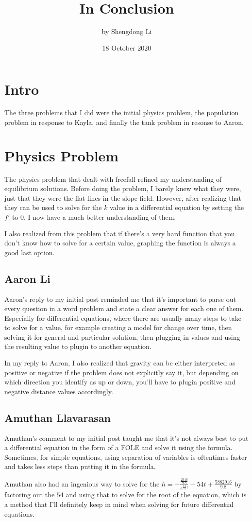 \documentclass[12pt]{article}
\begin{document}
\title{In Conclusion}
\author{by Shengdong Li}
\date{18 October 2020}
\maketitle

\section{Intro}
The three problems that I did were the initial physics problem, the population problem in response to Kayla, and finally the tank problem in resonse to Aaron.

\section{Physics Problem}
The physics problem that dealt with freefall refined my understanding of equilibrium solutions. Before doing the problem, I barely knew what they were, just that they were the flat lines in the slope field. However, after realizing that they can be used to solve for the $k$ value in a differential equation by setting the $f'$ to $0$, I now have a much better understanding of them. \par
I also realized from this problem that if there's a very hard function that you don't know how to solve for a certain value, graphing the function is always a good last option.
\subsection{Aaron Li}
Aaron's reply to my initial post reminded me that it's important to parse out every question in a word problem and state a clear answer for each one of them. Especially for differential equations, where there are usually many steps to take to solve for a value, for example creating a model for change over time, then solving it for general and particular solution, then plugging in values and using the resulting value to plugin to another equation.\par
In my reply to Aaron, I also realized that gravity can be either interpreted as positive or negative if the problem does not explicitly say it, but depending on which direction you identify as up or down, you'll have to plugin positive and negative distance values accordingly. 
\subsection{Amuthan Llavarasan}
Amuthan's comment to my initial post taught me that it's not always best to put a differential equation in the form of a FOLE and solve it using the formula. Sometimes, for simple equations, using separation of variables is oftentimes faster and takes less steps than putting it in the formula. \par
Amuthan also had an ingenious way to solve for the $h=-\frac{\frac{2916}{9.8}}{e^{\frac{9.8}{54}t}}-54t+\frac{5882916}{9.8}$ by factoring out the $54$ and using that to solve for the root of the equation, which is a method that I'll definitely keep in mind when solving for future differential equations.
\end{document}
